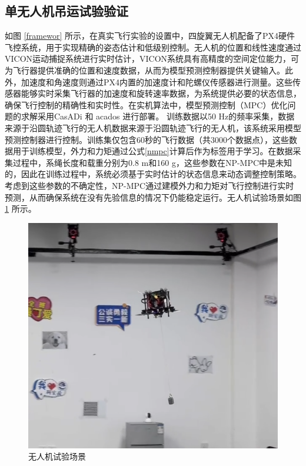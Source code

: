 \documentclass[lang=chs, degree=master, blindreview=false, winfonts=true]{yanputhesis}
\begin{document}
\subsection{单无人机吊运试验验证}
如图 \ref{framewor} 所示，在真实飞行实验的设置中，四旋翼无人机配备了PX4硬件飞控系统，用于实现精确的姿态估计和低级别控制。无人机的位置和线性速度通过VICON运动捕捉系统进行实时估计，VICON系统具有高精度的空间定位能力，可为飞行器提供准确的位置和速度数据，从而为模型预测控制器提供关键输入。此外，加速度和角速度则通过PX4内置的加速度计和陀螺仪传感器进行测量。这些传感器能够实时采集飞行器的加速度和旋转速率数据，为系统提供必要的状态信息，确保飞行控制的精确性和实时性。在实机算法中，模型预测控制（MPC）优化问题的求解采用CasADi \cite{Andersson2019} 和 acados \cite{Verschueren2022} 进行部署。
训练数据以50 Hz的频率采集，数据来源于沿圆轨迹飞行的无人机数据来源于沿圆轨迹飞行的无人机，该系统采用模型预测控制器进行控制。训练集仅包含60秒的飞行数据（共3000个数据点），这些数据用于训练模型，外力和力矩通过公式\ref{nmpc}计算后作为标签用于学习。在数据采集过程中，系绳长度和载重分别为0.8 m和160 g，这些参数在NP-MPC中是未知的，因此在训练过程中，系统必须基于实时估计的状态信息来动态调整控制策略。考虑到这些参数的不确定性，NP-MPC通过建模外力和力矩对飞行控制进行实时预测，从而确保系统在没有先验信息的情况下仍能稳定运行。无人机试验场景如图 \ref{dan} 所示。
\begin{figure}[hbt!]
	\centering
	\includegraphics[width=28pc]{picture/danjireal.png} 
	\caption{无人机试验场景} 
	\label{dan}
\end{figure}
\end{document}
